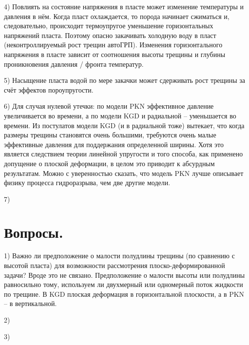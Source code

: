 \documentclass[a4paper, 11pt]{article}
\begin{document}
4) Повлиять на состояние напряжения в пласте может изменение температуры и давления в нём.
Когда пласт охлаждается, то порода начинает сжиматься и, следовательно, происходит термоупругое уменьшение горизонтальных напряжений пласта.
Поэтому опасно закачивать холодную воду в пласт (неконтроллируемый рост трещин автоГРП).
Изменения горизонтального напряжения в пласте зависит от соотношения высоты трещины и глубины проникновения давления / фронта температур.

5) Насыщение пласта водой по мере закачки может сдерживать рост трещины за счёт эффектов пороупругости.

6) Для случая нулевой утечки: по модели PKN эффективное давление увеличивается во времени, а по модели KGD и радиальной -- уменьшается во времени.
Из постулатов модели KGD (и в радиальной тоже) вытекает, что когда размеры трещины становятся очень большими, требуются очень малые эффективные давления для поддержания определенной ширины.
Хотя это является следствием теории линейной упругости и того способа, как применено допущение о плоской деформации, в целом это приводит к абсурдным результатам.
Можно с уверенностью сказать, что модель PKN лучше описывает физику процесса гидроразрыва, чем две другие модели.

7)
\\

\section{Вопросы.}

1) Важно ли предположение о малости полудлины трещины (по сравнению с высотой пласта) для возможности рассмотрения плоско-деформированной задачи?
Вроде это не связано.
Предположение о малости высоты или полудлины равносильно тому, используем ли двухмерный или одномерный поток жидкости по трещине.
В KGD плоская деформация в горизонтальной плоскости, а в PKN -- в вертикальной.

2) 

3)
\end{document}

